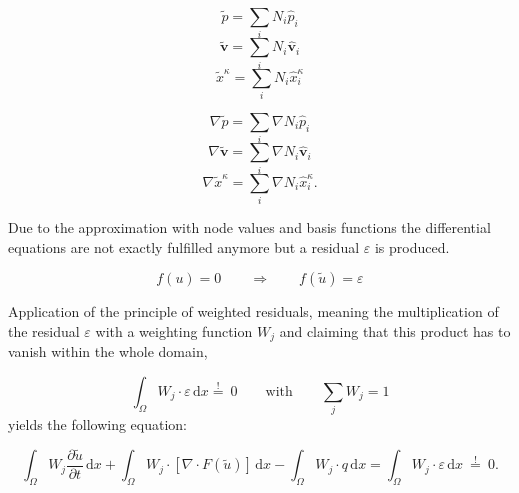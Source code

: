 \begin{minipage}[b]{0.47\textwidth}
\begin{equation}
\label{eq:p}
	\tilde p = \sum_i N_i \hat{p}_i
\end{equation}
\begin{equation}
\label{eq:v}
	\tilde{\mathbf v} = \sum_i N_i \hat{\mathbf v}_i
\end{equation}
\begin{equation}
\label{eq:x}
	\tilde x^\kappa  = \sum_i N_i \hat x_i^\kappa
\end{equation}
\end{minipage}
\hfill
\begin{minipage}[b]{0.47\textwidth}
\begin{equation}
\label{eq:dp}
	\nabla \tilde p = \sum_i \nabla N_i \hat{p}_i
\end{equation}
\begin{equation}
\label{eq:dv}
	\nabla \tilde{\mathbf v} = \sum_i \nabla N_i \hat{\mathbf v}_i
\end{equation}
\begin{equation}
\label{eq:dx}
	\nabla \tilde x^\kappa  = \sum_i \nabla N_i \hat x_i^\kappa .
\end{equation}
\end{minipage}

Due to the approximation with node values and basis functions the differential
equations are not exactly fulfilled anymore but a residual $\varepsilon$ is produced.

\begin{equation}
	f(u) = 0  \qquad \Rightarrow \qquad f(\tilde u) = \varepsilon
\end{equation}

Application of the principle of weighted residuals, meaning the multiplication
of the residual $\varepsilon$ with a weighting function $W_j$  and claiming that
this product has to vanish within the whole domain,

\begin{equation}
	\int_\Omega W_j \cdot \varepsilon \, \mathrm{d}x \overset {!}{=} \: 0 \qquad \textrm{with} \qquad \sum_j W_j =1
\end{equation}
yields the following equation:

\begin{equation}
	\int_\Omega W_j \frac{\partial \tilde u}{\partial t} \, \mathrm{d}x + \int_\Omega W_j
	\cdot \left[ \nabla \cdot F(\tilde u) \right]  \, \mathrm{d}x - \int_\Omega W_j
	\cdot q \, \mathrm{d}x = \int_\Omega W_j \cdot \varepsilon \, \mathrm{d}x \: \overset {!}{=} \: 0.	
\label{eq:weightedResidual}	
\end{equation}


